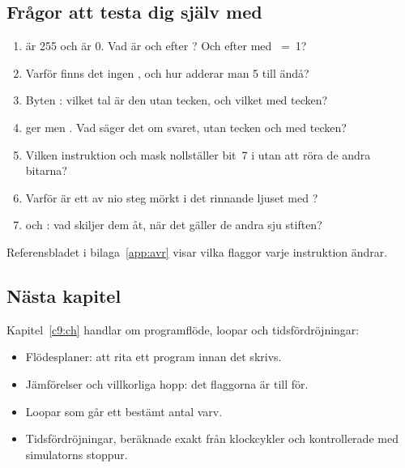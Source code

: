 \subsection*{Frågor att testa dig själv med}
\begin{enumerate}
  \item {} är 255 och  är 0. Vad är  och  efter ?
    Och efter  med ~=~1?
  \item Varför finns det ingen , och hur adderar man 5 till  ändå?
  \item Byten : vilket tal är den utan tecken, och vilket med tecken?
  \item {} ger  men . Vad säger det om svaret, utan tecken
    och med tecken?
  \item Vilken instruktion och mask nollställer bit~7 i  utan att röra de andra bitarna?
  \item Varför är ett av nio steg mörkt i det rinnande ljuset med ?
  \item {} och : vad skiljer dem åt, när det gäller de andra
    sju stiften?
\end{enumerate}

Referensbladet i bilaga~\ref{app:avr} visar vilka flaggor varje instruktion ändrar.

\subsection*{Nästa kapitel}
Kapitel~\ref{c9:ch} handlar om programflöde, loopar och tidsfördröjningar:
\begin{itemize}
  \item Flödesplaner: att rita ett program innan det skrivs.
  \item Jämförelser och villkorliga hopp: det flaggorna är till för.
  \item Loopar som går ett bestämt antal varv.
  \item Tidsfördröjningar, beräknade exakt från klockcykler och kontrollerade med simulatorns
    stoppur.
\end{itemize}
